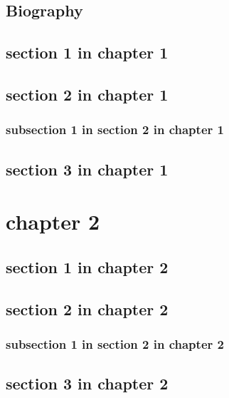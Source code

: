 \documentclass{report}
\begin{document}
      \section*{Biography}
 
  \section{section 1 in chapter 1} 
  \lipsum[1-2] 
 
  \section{section 2 in chapter 1} 
  \lipsum[1-2] 
  \subsection{subsection 1 in section 2 in chapter 1} 
  \lipsum[1-2] 
 
  \section{section 3 in chapter 1} 
  \lipsum[1-2] 
 
 
\ifdefined\HCode 
{} 
\fi 
 
\ifdefined\HCode 
\else 
{ 
\stopcontents[chapter] 
} 
\fi 
 
 
\chapter{chapter 2} 
  \lipsum[10] 
 
  \section{section 1 in chapter 2} 
  \lipsum[1-2] 
 
  \section{section 2 in chapter 2} 
  \lipsum[1-2] 
  \subsection{subsection 1 in section 2 in chapter 2} 
  \lipsum[1-2] 
 
  \section{section 3 in chapter 2} 
  \lipsum[1-2] 
 
\end{document}
